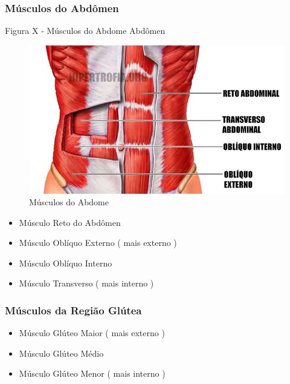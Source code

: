 \documentclass[
]{book}
\providecommand{\tightlist}{%
  \setlength{\itemsep}{0pt}\setlength{\parskip}{0pt}}
\begin{document}
\hypertarget{muxfasculos-do-abduxf4men}{%
\subsubsection{Músculos do Abdômen}\label{muxfasculos-do-abduxf4men}}

Figura X - Músculos do Abdome \textbar{} Abdômen

\begin{figure}

{\centering \includegraphics[width=0.9\linewidth]{figuras/Aula5-7-musculos-do-abdome} 

}

\caption{Músculos do Abdome}\label{fig:unnamed-chunk-11}
\end{figure}

\begin{itemize}
\tightlist
\item
  Músculo Reto do Abdômen
\item
  Músculo Oblíquo Externo ( mais externo )
\item
  Músculo Oblíquo Interno
\item
  Músculo Transverso ( mais interno )
\end{itemize}

\hypertarget{muxfasculos-da-regiuxe3o-gluxfatea}{%
\subsubsection{Músculos da Região Glútea}\label{muxfasculos-da-regiuxe3o-gluxfatea}}

\begin{itemize}
\tightlist
\item
  Músculo Glúteo Maior ( mais externo )
\item
  Músculo Glúteo Médio
\item
  Músculo Glúteo Menor ( mais interno )
\end{itemize}
\end{document}
